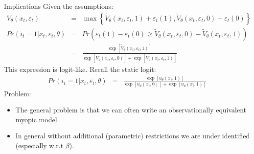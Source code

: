 \documentclass[xcolor=pdftex,dvipsnames,table,mathserif]{beamer}
\begin{document}
\begin{frame}{ Implications}
Given the assumptions:
\begin{eqnarray*}
V_{\theta}(x_t,\varepsilon_t) &=& \max \left\{ \tilde V_{\theta} (x_t, \varepsilon_t, 1) + \varepsilon_{t}(1) ,\tilde V_{\theta} (x_t, \varepsilon_t, 0) + \varepsilon_{t}(0) \right\}\\
Pr(i_t=1 | x_t,\varepsilon_t,\theta) &=& Pr\left(\varepsilon_{t}(1) - \varepsilon_{t}(0) \geq \tilde V_{\theta} (x_t, \varepsilon_t, 0) - \tilde V_{\theta} (x_t, \varepsilon_t, 1) \right) \\
&=& \frac {\exp[\tilde V_{\theta} (x_t, \varepsilon_t, 1)]  }{\exp[\tilde V_{\theta} (x_t, \varepsilon_t, 0)] + \exp[\tilde V_{\theta} (x_t, \varepsilon_t, 1)]} 
\end{eqnarray*}
This expression is logit-like. Recall the static logit:
\begin{eqnarray*}
Pr(i_t=1 | x_t,\varepsilon_t,\theta) &=& \frac {\exp[u_{\theta} (x_t, 1)]  }{\exp[u_{\theta} (x_t, 0)] + \exp[u_{\theta} (x_t, 1)]} 
\end{eqnarray*}
Problem:
\begin{itemize}
\item The general problem is that we can often write an observationally equivalent \alert{myopic model}
\item In general without additional (parametric) restrictions we are under identified (especially w.r.t $\beta$).
\end{itemize}
\end{frame}



\end{document}
